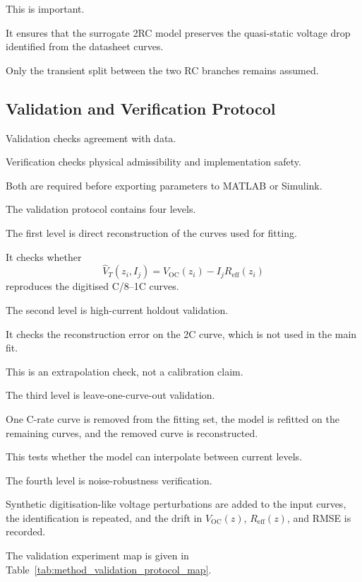 \documentclass[a4paper,12pt]{article}
\begin{document}
This is important.

It ensures that the surrogate 2RC model preserves the quasi-static voltage drop identified from the datasheet curves.

Only the transient split between the two RC branches remains assumed.

\subsection{Validation and Verification Protocol}

Validation checks agreement with data.

Verification checks physical admissibility and implementation safety.

Both are required before exporting parameters to MATLAB or Simulink.

The validation protocol contains four levels.

The first level is direct reconstruction of the curves used for fitting.

It checks whether
\[
\hat{V}_T(z_i,I_j)
=
V_{\mathrm{OC}}(z_i)
-
I_jR_{\mathrm{eff}}(z_i)
\]
reproduces the digitised C/8--1C curves.

The second level is high-current holdout validation.

It checks the reconstruction error on the 2C curve, which is not used in the main fit.

This is an extrapolation check, not a calibration claim.

The third level is leave-one-curve-out validation.

One C-rate curve is removed from the fitting set, the model is refitted on the remaining curves, and the removed curve is reconstructed.

This tests whether the model can interpolate between current levels.

The fourth level is noise-robustness verification.

Synthetic digitisation-like voltage perturbations are added to the input curves, the identification is repeated, and the drift in \(V_{\mathrm{OC}}(z)\), \(R_{\mathrm{eff}}(z)\), and RMSE is recorded.

The validation experiment map is given in Table~\ref{tab:method_validation_protocol_map}.
\end{document}
